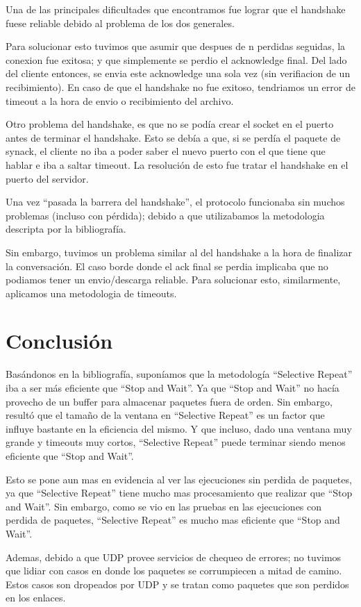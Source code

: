 \documentclass{article}
\begin{document}
Una de las principales dificultades que encontramos fue lograr que el handshake fuese reliable debido al problema de los dos generales.

Para solucionar esto tuvimos que asumir que despues de n perdidas seguidas, la conexion fue exitosa; y que simplemente se perdio el acknowledge final. Del lado del cliente entonces, se envia este acknowledge una sola vez (sin verifiacion de un recibimiento). 
En caso de que el handshake no fue exitoso, tendriamos un error de timeout a la hora de envio o recibimiento del archivo.

Otro problema del handshake, es que no se podía crear el socket en el puerto antes de terminar el handshake. Esto se debía a que, si se perdía el paquete de synack, el cliente no iba a poder saber el nuevo puerto con el que tiene que hablar e iba a saltar timeout. La resolución de esto fue tratar el handshake en el puerto del servidor.

Una vez ``pasada la barrera del handshake'', el protocolo funcionaba sin muchos problemas (incluso con pérdida); debido a que utilizabamos la metodologia descripta por la bibliografía.

Sin embargo, tuvimos un problema similar al del handshake a la hora de finalizar la conversación. El caso borde donde el ack final se perdia implicaba que no podiamos tener un envio/descarga reliable. Para solucionar esto, similarmente, aplicamos una metodologia de timeouts. 

\section{\texorpdfstring{\textbf{Conclusión}}{Conclusión}}\label{conclusiuxf3n-wip}
Basándonos en la bibliografía, suponíamos que la metodología ``Selective Repeat'' iba a ser más eficiente que ``Stop and Wait''. Ya que ``Stop and Wait'' no hacía provecho de un buffer para almacenar paquetes fuera de orden.
Sin embargo, resultó que el tamaño de la ventana en ``Selective Repeat'' es un factor que influye bastante en la eficiencia del mismo. Y que incluso, dado una ventana muy grande y timeouts muy cortos, ``Selective Repeat'' puede terminar siendo menos eficiente que ``Stop and Wait''.

Esto se pone aun mas en evidencia al ver las ejecuciones sin perdida de paquetes, ya que ``Selective Repeat'' tiene mucho mas procesamiento que realizar que ``Stop and Wait''. Sin embargo, como se vio en las pruebas en las ejecuciones con perdida de paquetes, ``Selective Repeat'' es mucho mas eficiente que ``Stop and Wait''.


Ademas, debido a que UDP provee servicios de chequeo de errores; no tuvimos que lidiar con casos en donde los paquetes se corrumpiecen a mitad de camino. Estos casos son dropeados por UDP y se tratan como paquetes que son perdidos en los enlaces.
\end{document}

